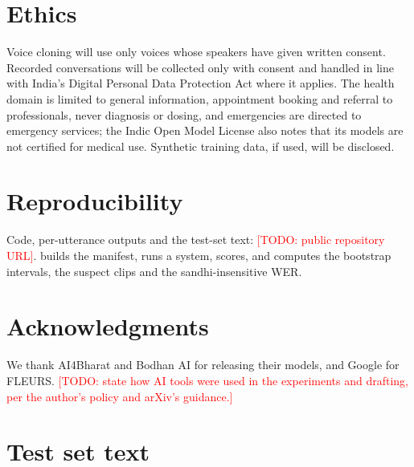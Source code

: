 \documentclass[11pt]{article}
\newcommand{\todo}[1]{\textcolor{red}{[TODO: #1]}}
\begin{document}
\section{Ethics}

Voice cloning will use only voices whose speakers have given written consent. Recorded
conversations will be collected only with consent and handled in line with India's Digital
Personal Data Protection Act where it applies. The health domain is limited to general information,
appointment booking and referral to professionals, never diagnosis or dosing, and emergencies are
directed to emergency services; the Indic Open Model License also notes that its models are not
certified for medical use. Synthetic training data, if used, will be disclosed.

\section*{Reproducibility}

Code, per-utterance outputs and the test-set text: \todo{public repository URL}.
 builds the manifest,  runs a system,
 scores, and  computes the bootstrap intervals, the
suspect clips and the sandhi-insensitive WER.

\section*{Acknowledgments}

We thank AI4Bharat and Bodhan AI for releasing their models, and Google for FLEURS.
\todo{state how AI tools were used in the experiments and drafting, per the author's policy and
arXiv's guidance.}




\appendix
\section{Test set text}
\label{app:testset}
\end{document}
